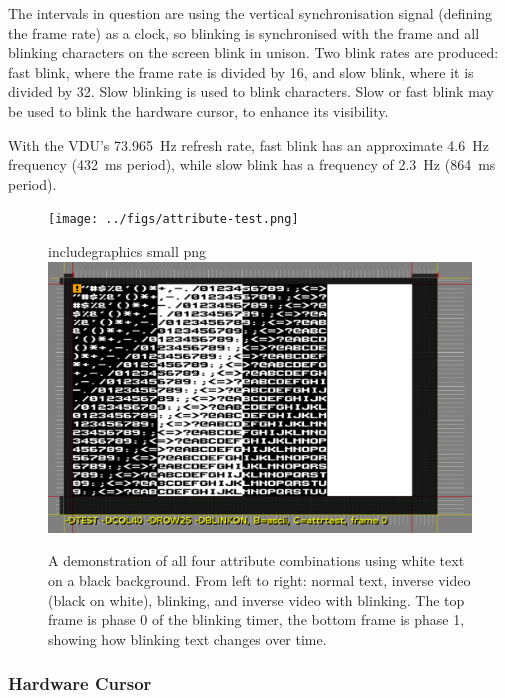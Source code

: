 The intervals in question are using the vertical synchronisation signal
(defining the frame rate) as a clock, so blinking is synchronised with the
frame and all blinking characters on the screen blink in unison. Two blink
rates are produced: fast blink, where the frame rate is divided by 16, and slow
blink, where it is divided by 32. Slow blinking is used to blink
characters. Slow or fast blink may be used to blink the hardware cursor, to
enhance its visibility.

With the VDU's 73.965~Hz refresh rate, fast blink has an approximate 4.6~Hz
frequency (432~ms period), while slow blink has a frequency of 2.3~Hz (864~ms
period).

\begin{figure}
  \centering
  \ifxetex
    \texttt{[image: ../figs/attribute-test.png]}
  \else
    \begin{htmldiv}{includegraphics small png}%
      \includegraphics{../figs/attribute-test.gif}%
    \end{htmldiv}%
  \fi
  \caption[Demonstration of Attributes]{\label{fig:attributes}A demonstration
    of all four attribute combinations using white text on a black
    background. From left to right: normal text, inverse video (black on
    white), blinking, and inverse video with blinking. The top frame is phase 0 of the
    blinking timer, the bottom frame is phase 1, showing how blinking text
    changes over time.}
\end{figure}


\subsubsection{Hardware Cursor}
\label{sec:vdu:cursor}


